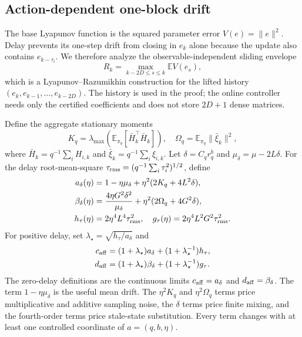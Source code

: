 \documentclass[journal]{IEEEtran}
\newcommand{\E}{\mathbb{E}}
\begin{document}
\subsection{Action-dependent one-block drift}
The base Lyapunov function is the squared parameter error $V(e)=\|e\|^2$.
Delay prevents its one-step drift from closing in $e_k$ alone because the update also contains $e_{k-\tau_i}$.
We therefore analyze the observable-independent sliding envelope
\begin{equation}
R_k=\max_{k-2D\le s\le k}\E V(e_s),
\label{eq:sliding-envelope}
\end{equation}
which is a Lyapunov--Razumikhin construction for the lifted history $(e_k,e_{k-1},\ldots,e_{k-2D})$.
The history is used in the proof; the online controller needs only the certified coefficients and does not store $2D+1$ dense matrices.

Define the aggregate stationary moments
\begin{equation}
K_q=\lambda_{\max}\!\left(\E_{\pi_q}[\bar H_k^\top\bar H_k]\right),
\quad
\Omega_q=\E_{\pi_q}\|\bar\xi_k\|^2,
\end{equation}
where $\bar H_k=q^{-1}\sum_iH_{i,k}$ and $\bar\xi_k=q^{-1}\sum_i\xi_{i,k}$.
Let $\delta=C_qr_q^b$ and $\mu_\delta=\mu-2L\delta$.
For the delay root-mean-square $\tau_{\rm rms}=(q^{-1}\sum_i\tau_i^2)^{1/2}$, define
\begin{align}
a_\delta(\eta)&=1-\eta\mu_\delta+\eta^2(2K_q+4L^2\delta),\nonumber\\
\beta_\delta(\eta)&=\frac{4\eta G^2\delta^2}{\mu_\delta}+\eta^2(2\Omega_q+4G^2\delta),\nonumber\\
h_\tau(\eta)&=2\eta^4L^4\tau_{\rm rms}^2,
\quad
g_\tau(\eta)=2\eta^4L^2G^2\tau_{\rm rms}^2.
\label{eq:affine-terms}
\end{align}
For positive delay, set $\lambda_\star=\sqrt{h_\tau/a_\delta}$ and
\begin{align}
c_{\rm aff}&=(1+\lambda_\star)a_\delta+(1+\lambda_\star^{-1})h_\tau,\nonumber\\
d_{\rm aff}&=(1+\lambda_\star)\beta_\delta+(1+\lambda_\star^{-1})g_\tau.
\label{eq:affine-cd}
\end{align}
The zero-delay definitions are the continuous limits $c_{\rm aff}=a_\delta$ and $d_{\rm aff}=\beta_\delta$.
The term $1-\eta\mu_\delta$ is the useful mean drift.
The $\eta^2K_q$ and $\eta^2\Omega_q$ terms price multiplicative and additive sampling noise, the $\delta$ terms price finite mixing, and the fourth-order terms price stale-state substitution.
Every term changes with at least one controlled coordinate of $a=(q,b,\eta)$.
\end{document}
